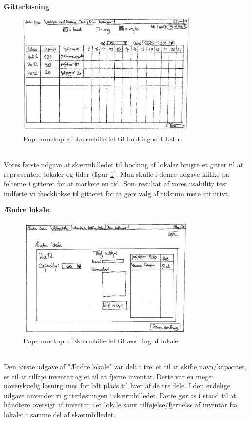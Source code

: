 \textbf{Gitterløsning}
\begin{figure}[h!]
  \centering
    \includegraphics[width=0.8\textwidth]{Appendix/GUI-Prototype/PaperMockup/LokaleListe_001}
  \caption{Papermockup af skærmbilledet til booking af lokaler.}
\label{Design_G_Development_LokaleListe_pm}
\end{figure} 
\\Vores første udgave af skærmbilledet til booking af lokaler brugte et gitter til at repræsentere lokaler og tider (figur \ref{Design_G_Development_LokaleListe_pm}). Man skulle i denne udgave klikke på felterne i gitteret for at markere en tid. Som resultat af vores usability test indførte vi checkbokse til gitteret for at gøre valg af tidsrum mere intuitivt.

\clearpage
\textbf{Ændre lokale}
\begin{figure}[h!]
  \centering
    \includegraphics[width=0.8\textwidth]{Appendix/GUI-Prototype/PaperMockup/AendreLokale_001}
  \caption{Papermockup af skærmbilledet til ændring af lokale.}
\label{Design_G_Development_AendreLokale_Final}
\end{figure} 
\\Den første udgave af "Ændre lokale" var delt i tre: et til at skifte navn/kapacitet, et til at tilføje inventar og et til at fjerne inventar. Dette var en meget uoverskuelig løsning med for lidt plads til hver af de tre dele. I den endelige udgave anvender vi gitterløsningen i skærmbilledet. Dette gør os i stand til at håndtere oversigt af inventar i et lokale samt tilføjelse/fjernelse af inventar fra lokalet i samme del af skærmbilledet.

